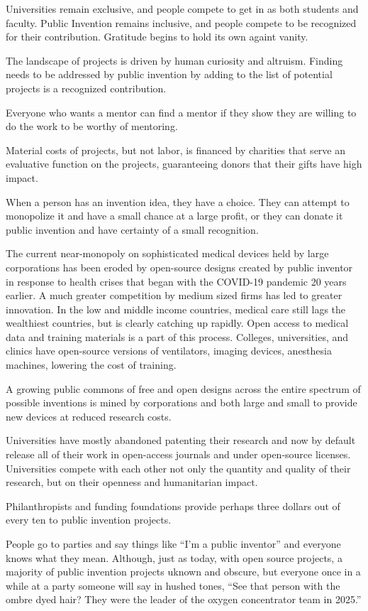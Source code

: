 \documentclass[
	fontsize=10pt, %
	twoside=false, %
	secnumdepth=1, %
]{kaobook}
\begin{document}
Universities remain exclusive, and people compete to get in as
both students and faculty.
Public Invention remains inclusive, and people compete to
be recognized for their contribution. Gratitude begins
to hold its own againt vanity.

The landscape of projects is driven by human curiosity and
altruism. Finding needs to be addressed by public invention
by adding to the list of potential projects is a recognized
contribution.

Everyone who wants a mentor can find a mentor if they
show they are willing
to do the work to be worthy of mentoring.

Material costs of projects, but not labor, is financed by
charities that serve an evaluative function on the projects,
guaranteeing donors that their gifts have high impact.

When a person has an invention idea, they have a choice.
They can attempt to monopolize it and have a small chance at
a large profit, or they can donate it public invention and
have certainty of a small recognition.

The current near-monopoly on sophisticated medical devices held by
large corporations has been eroded by open-source designs
created by public inventor in response to health crises that
began with the COVID-19 pandemic 20 years earlier.
A much greater competition by medium sized firms has led to
greater innovation. In the low and middle income countries,
medical care still lags the wealthiest countries, but is
clearly catching up rapidly.
Open access to medical data and training materials is a
part of this process. Colleges, universities, and clinics
have open-source versions of ventilators, imaging devices,
anesthesia machines, lowering the cost of training.

A growing public commons of free and open designs
across the entire spectrum of possible inventions
is mined by corporations and both large and small to provide
new devices at reduced research costs.

Universities have mostly abandoned patenting their research
and now by default release all of their work in open-access journals
and under open-source licenses. Universities compete with each
other not only the quantity and quality of their research, but
on their openness and humanitarian impact.

Philanthropists and funding foundations provide perhaps three
dollars out of every ten to public invention projects.

People go to parties and say things like ``I'm a public inventor''
and everyone knows what they mean.
Although, just as today, with open source projects, a majority
of public invention projects uknown and obscure, but
everyone once in a while at a party someone will say in hushed tones,
``See that person with the ombre dyed hair? They were the
leader of the oxygen concentrator team in 2025.''
\end{document}
